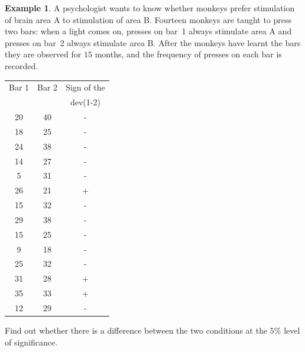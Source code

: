 \documentclass[11pt,a4paper]{article}
\theoremstyle{definition}
\newtheorem{example}[thm]{Example}
\begin{document}
\begin{example}
A psychologist wants to know whether monkeys prefer stimulation of brain area A to
stimulation of area B. Fourteen monkeys are taught to press two bars: when a light
comes on, presses on bar~1 always stimulate area A and presses on bar~2 always
stimulate area B. After the monkeys have learnt the bars they are observed for
$15$ months, and the frequency of presses on each bar is recorded.

\begin{table}[H]
\centering
\begin{tabular}{c|c|c}
Bar 1&Bar 2& Sign of the\\
&&dev(1-2)\\
\hline 20&40&-\\
18&25&-\\
24&38&-\\
14&27&-\\
5&31&-\\
26&21&+\\
15&32&-\\
29&38&-\\
15&25&-\\
9&18&-\\
25&32&-\\
31&28&+\\
35&33&+\\
12&29&-\\
\end{tabular}
\end{table}

Find out whether there is a difference between the two conditions at the $5\%$
level of significance.
\end{example}
\end{document}
